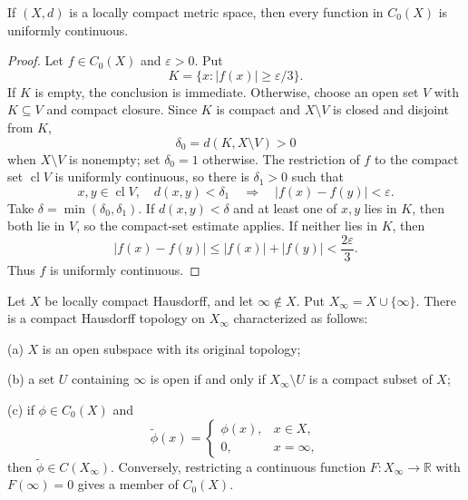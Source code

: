 \begin{thm}
If $(X,d)$ is a locally compact metric space, then every function in $C_0(X)$
is uniformly continuous.
\end{thm}

\begin{proof}
Let $f\in C_0(X)$ and $\varepsilon>0$. Put
\[
K=\{x:|f(x)|\geq\varepsilon/3\}.
\]
If $K$ is empty, the conclusion is immediate. Otherwise, choose an open set
$V$ with $K\subseteq V$ and compact closure. Since $K$ is compact and
$X\setminus V$ is closed and disjoint from $K$,
\[
\delta_0=d(K,X\setminus V)>0
\]
when $X\setminus V$ is nonempty; set $\delta_0=1$ otherwise. The restriction
of $f$ to the compact set $\operatorname{cl}V$ is uniformly continuous, so
there is $\delta_1>0$ such that
\[
x,y\in\operatorname{cl}V,
\quad d(x,y)<\delta_1
\quad\Longrightarrow\quad
|f(x)-f(y)|<\varepsilon.
\]
Take $\delta=\min(\delta_0,\delta_1)$. If $d(x,y)<\delta$ and at least one of
$x,y$ lies in $K$, then both lie in $V$, so the compact-set estimate applies.
If neither lies in $K$, then
\[
|f(x)-f(y)|\leq |f(x)|+|f(y)|<\frac{2\varepsilon}{3}.
\]
Thus $f$ is uniformly continuous.
\end{proof}

\begin{thm}
Let $X$ be locally compact Hausdorff, and let $\infty\notin X$. Put
$X_\infty=X\cup\{\infty\}$. There is a compact Hausdorff topology on
$X_\infty$ characterized as follows:

(a) $X$ is an open subspace with its original topology;

(b) a set $U$ containing $\infty$ is open if and only if
$X_\infty\setminus U$ is a compact subset of $X$;

(c) if $\phi\in C_0(X)$ and
\[
\widetilde\phi(x)=
\begin{cases}
\phi(x),&x\in X,\\
0,&x=\infty,
\end{cases}
\]
then $\widetilde\phi\in C(X_\infty)$. Conversely, restricting a continuous
function $F:X_\infty\to\mathbb{R}$ with $F(\infty)=0$ gives a member of
$C_0(X)$.
\end{thm}


